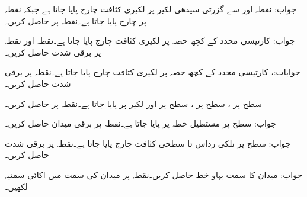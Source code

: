  

جواب:
نقطہ  اور  سے گزرتی سیدھی لکیر پر لکیری کثافت چارج  پایا جاتا ہے جبکہ نقطہ  پر  چارج پایا جاتا ہے۔نقطہ  پر  حاصل کریں۔

جواب:
کارتیسی  محدد کے کچھ حصہ  پر لکیری کثافت چارج  پایا جاتا ہے۔نقطہ   اور نقطہ   پر برقی شدت  حاصل کریں۔

جوابات:، 
کارتیسی  محدد کے کچھ حصہ  پر لکیری کثافت چارج  پایا جاتا
 ہے۔نقطہ  پر برقی شدت  حاصل کریں۔

سطح  پر ، سطح  پر ، سطح  پر  اور لکیر  پر
  پایا جاتا ہے۔نقطہ  پر  حاصل کریں۔

جواب:
سطح  پر مستطیل خطہ   پر  پایا جاتا ہے۔نقطہ  پر برقی میدان  حاصل کریں۔

جواب:
سطح  پر نلکی رداس  تا  سطحی کثافت چارج  پایا جاتا ہے۔نقطہ  پر برقی شدت  حاصل کریں۔

جواب:
میدان  کا سمت بہاو خط حاصل کریں۔نقطہ  پر میدان کی سمت میں اکائی سمتیہ لکھیں۔

